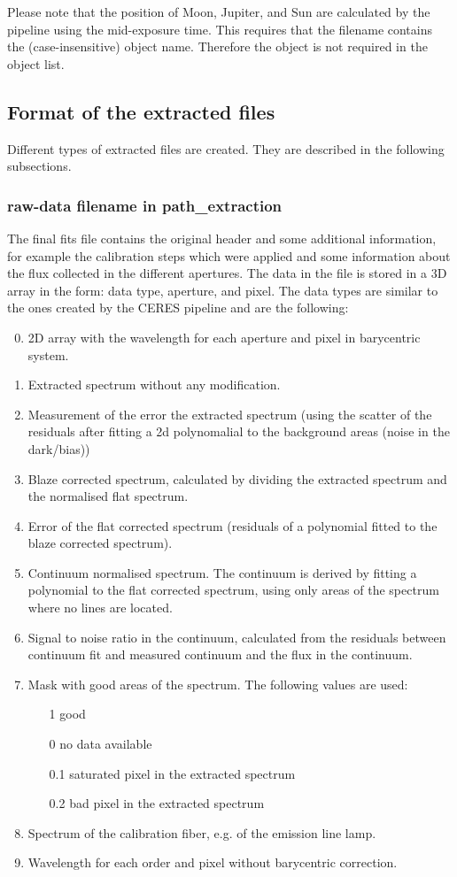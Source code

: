 \documentclass[10pt,a4paper]{article}
\begin{document}
Please note that the position of Moon, Jupiter, and Sun are calculated by the pipeline using the mid-exposure time. This requires that the filename contains the (case-insensitive) object name. Therefore the object is not required in the object list.


\subsection{Format of the extracted files}
Different types of extracted files are created. They are described in the following subsections.

\subsubsection{raw-data filename in path\_extraction}
\label{section:extraction_data_format}
The final fits file contains the original header and some additional information, for example the calibration steps which were applied and some information about the flux collected in the different apertures. The data in the file is stored in a 3D array in the form: data type, aperture, and pixel. The data types are similar to the ones created by the CERES pipeline and are the following:
\begin{enumerate}
  \setcounter{enumi}{-1}
  \item 2D array with the wavelength for each aperture and pixel in barycentric system.
  \item Extracted spectrum without any modification.
  \item Measurement of the error the extracted spectrum (using the scatter of the residuals after fitting a 2d polynomalial to the background areas (noise in the dark/bias))
  \item Blaze corrected spectrum, calculated by dividing the extracted spectrum and the normalised flat spectrum.
  \item Error of the flat corrected spectrum (residuals of a polynomial fitted to the blaze corrected spectrum).
  \item Continuum normalised spectrum. The continuum is derived by fitting a polynomial to the flat corrected spectrum, using only areas of the spectrum where no lines are located. 
  \item Signal to noise ratio in the continuum, calculated from the residuals between continuum fit and measured continuum and the flux in the continuum.
  \item Mask with good areas of the spectrum. The following values are used:
  \begin{itemize}
    \item[1] good
    \item[0] no data available
    \item[0.1] saturated pixel in the extracted spectrum
    \item[0.2] bad pixel in the extracted spectrum
  \end{itemize}
  \item Spectrum of the calibration fiber, e.g. of the emission line lamp.
  \item Wavelength for each order and pixel without barycentric correction.
\end{enumerate}
\end{document}
